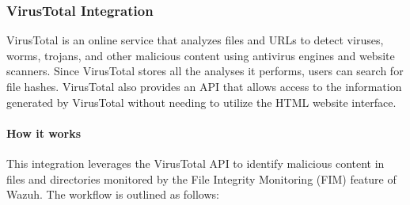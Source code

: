 \subsubsection{VirusTotal Integration}
\label{virustotal}
VirusTotal is an online service that analyzes files and URLs to detect viruses, worms, trojans, and other malicious content using antivirus engines and website scanners. Since VirusTotal stores all the analyses it performs, users can search for file hashes. VirusTotal also provides an API that allows access to the information generated by VirusTotal without needing to utilize the HTML website interface.

\paragraph{How it works}
This integration leverages the VirusTotal API to identify malicious content in files and directories monitored by the File Integrity Monitoring (FIM) feature of Wazuh. The workflow is outlined as follows:


